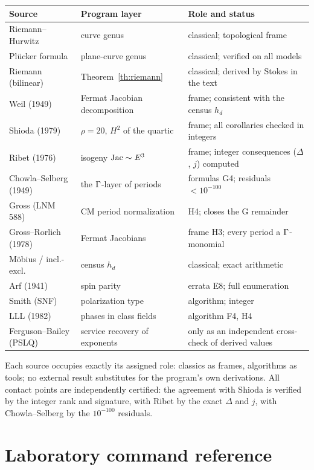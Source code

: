 \begin{center}
\small
\begin{tabularx}{\textwidth}{@{}l l >{\raggedright\arraybackslash}X@{}}
\toprule
Source & Program layer & Role and status \\
\midrule
Riemann--Hurwitz & curve genus & classical; topological frame \\
Pl\"ucker formula & plane-curve genus & classical; verified on all
models \\
Riemann (bilinear) & Theorem~\ref{th:riemann} & classical; derived
by Stokes in the text \\
Weil (1949) & Fermat Jacobian decomposition & frame; consistent
with the census $h_d$ \\
Shioda (1979) & $\rho=20$, $H^2$ of the quartic & frame; all
corollaries checked in integers \\
Ribet (1976) & isogeny $\operatorname{Jac}\sim E^3$ & frame; integer consequences
($\Delta$, $j$) computed \\
Chowla--Selberg (1949) & the $\Gamma$-layer of periods & formulas G4;
residuals $<10^{-100}$ \\
Gross (LNM 588) & CM period normalization & H4; closes the G
remainder \\
Gross--Rorlich (1978) & Fermat Jacobians & frame H3; every period a
$\Gamma$-monomial \\
M\"obius / incl.-excl. & census $h_d$ & classical; exact arithmetic \\
Arf (1941) & spin parity & errata E8; full enumeration \\
Smith (SNF) & polarization type & algorithm; integer \\
LLL (1982) & phases in class fields & algorithm F4, H4 \\
Ferguson--Bailey (PSLQ) & service recovery of exponents & only as an
independent cross-check of derived values \\
\bottomrule
\end{tabularx}
\end{center}

Each source occupies exactly its assigned role: classics as frames,
algorithms as tools; no external result substitutes for the
program's own derivations. All contact points are independently
certified: the agreement with Shioda is verified by the integer rank
and signature, with Ribet by the exact $\Delta$ and $j$, with
Chowla--Selberg by the $10^{-100}$ residuals.

\section{Laboratory command reference}\label{app:cli}

